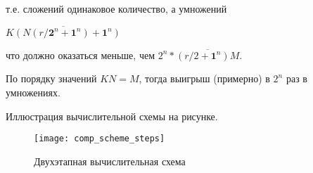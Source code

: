 т.е. сложений одинаковое количество, а умножений

$\overline{K (N(r/\mathbf{2}^n + \mathbf{1}^n) +\mathbf{1}^n)}$

что должно оказаться меньше, чем $2^n * \overline{(r/2+\mathbf{1}^n) M}$.

По порядку значений $KN = M$, тогда выигрыш (примерно) в $2^n$ раз в умножениях. 




Иллюстрация вычислительной схемы на рисунке.
\begin{figure}[h!]
  \centering
  \texttt{[image: comp\_scheme\_steps]} 
  \caption{Двухэтапная вычислительная схема}
  \label{fig:reg_net}
\end{figure}
\FloatBarrier


